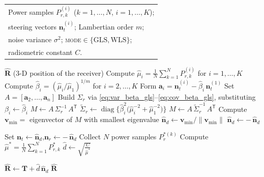 \documentclass[lettersize,journal]{IEEEtran}
\begin{document}
\begin{algorithm}[tb]
  \caption{3-D Position Estimation from $n$ Orientations}
  \label{alg:position}
  \small
  \begin{algorithmic}[1]
  \Require
    \begin{tabular}[t]{@{}l@{}}
      Power samples $P_{r,k}^{(i)}$ ($k=1,\dots,N$, $i=1,\dots,K$);\\
      steering vectors $\mathbf n_t^{(i)}$; Lambertian order $m$;\\
      noise variance $\sigma^{2}$; \textsc{mode}$\in\{\mathrm{GLS},\mathrm{WLS}\}$;\\
      radiometric constant $C$.
    \end{tabular}
  \Ensure
    $\hat{\mathbf R}$ (3-D position of the receiver)
  \Statex
  \State \quad Compute $\hat\mu_i=\tfrac{1}{N}\sum_{k=1}^N P_{r,k}^{(i)}$
            for $i=1,\dots,K$
  \State \quad Compute $\hat\beta_i=(\hat\mu_i/\hat\mu_1)^{1/m}$ for $i=2,\dots,K$
  \State \quad Form $\mathbf a_i = \mathbf n_t^{(i)} - \hat\beta_i\,\mathbf n_t^{(1)}$
  \State \quad Set $A = [\mathbf a_2,\dots,\mathbf a_n]$
    \State \quad Build $\Sigma_r$ via
           \eqref{eq:var_beta_gls}--\eqref{eq:cov_beta_gls},
           substituting $\beta_i \leftarrow \hat\beta_i$
    \State \quad $M \gets A\,\Sigma_r^{-1}\,A^{\mathsf T}$
  \Else{}
    \State \quad $\tilde\Sigma_r \gets 
           \operatorname{diag}\bigl\{\hat\beta_i^{2}\bigl(\hat\mu_i^{-2}+\hat\mu_1^{-2}\bigr)\bigr\}$
    \State \quad $M \gets A\,\tilde\Sigma_r^{-1}\,A^{\mathsf T}$
  \EndIf
  \State \quad Compute $\mathbf v_{\min} =$ eigenvector of $M$ with smallest eigenvalue
  \State \quad $\hat{\mathbf n}_d \gets \mathbf v_{\min}/\|\mathbf v_{\min}\|$
    \State \quad $\hat{\mathbf n}_d \gets -\,\hat{\mathbf n}_d$ 
  \EndIf

  \Statex
  \State \quad Set $\mathbf n_t \gets \hat{\mathbf n}_d$,\quad $\mathbf n_r \gets -\,\hat{\mathbf n}_d$
  \State \quad Collect $N$ power samples $P_r^{*(k)}$ 
  \State \quad Compute $\hat\mu^* = \tfrac{1}{N}\sum_{k=1}^{N} P_{r,k}^*$
  \State \quad $\hat d \gets \sqrt{\tfrac{C}{\hat\mu^*}}$

  \Statex
  \State \quad $\hat{\mathbf R} \gets \mathbf T + \hat d \,\hat{\mathbf n}_d$
  \State \Return $\hat{\mathbf R}$
  \end{algorithmic}
\end{algorithm}
\end{document}
